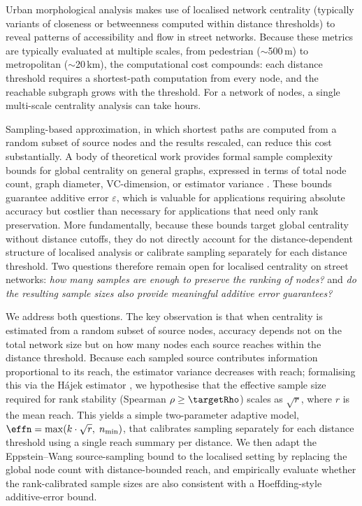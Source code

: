 
Urban morphological analysis makes use of localised network centrality (typically variants of closeness or betweenness computed within distance thresholds) to reveal patterns of accessibility and flow in street networks. Because these metrics are typically evaluated at multiple scales, from pedestrian ($\sim$500\,m) to metropolitan ($\sim$20\,km), the computational cost compounds: each distance threshold requires a shortest-path computation from every node, and the reachable subgraph grows with the threshold. For a network of \glaNnodes{} nodes, a single multi-scale centrality analysis can take hours.

Sampling-based approximation, in which shortest paths are computed from a random subset of source nodes and the results rescaled, can reduce this cost substantially. A body of theoretical work provides formal sample complexity bounds for global centrality on general graphs, expressed in terms of total node count, graph diameter, VC-dimension, or estimator variance \citep{Eppstein2004, Bader2007, Riondato2016, Borassi2019, Pellegrina2023}. These bounds guarantee additive error $\varepsilon$, which is valuable for applications requiring absolute accuracy but costlier than necessary for applications that need only rank preservation. More fundamentally, because these bounds target global centrality without distance cutoffs, they do not directly account for the distance-dependent structure of localised analysis or calibrate sampling separately for each distance threshold. Two questions therefore remain open for localised centrality on street networks: \emph{how many samples are enough to preserve the ranking of nodes?} and \emph{do the resulting sample sizes also provide meaningful additive error guarantees?}

We address both questions. The key observation is that when centrality is estimated from a random subset of source nodes, accuracy depends not on the total network size but on how many nodes each source reaches within the distance threshold. Because each sampled source contributes information proportional to its reach, the estimator variance decreases with reach; formalising this via the H\'{a}jek estimator \citep{Hajek1971}, we hypothesise that the effective sample size required for rank stability (Spearman $\rho \geq \targetRho$) scales as $\sqrt{r}$, where $r$ is the mean reach. This yields a simple two-parameter adaptive model, $\effn = \max(k \cdot \sqrt{r},\; n_{\min})$, that calibrates sampling separately for each distance threshold using a single reach summary per distance. We then adapt the Eppstein--Wang source-sampling bound \citep{Eppstein2004} to the localised setting by replacing the global node count with distance-bounded reach, and empirically evaluate whether the rank-calibrated sample sizes are also consistent with a Hoeffding-style additive-error bound.

